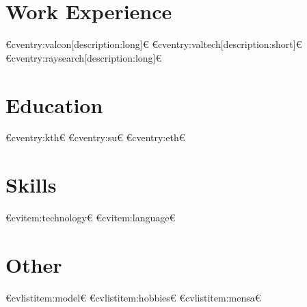 \documentclass[10pt,a4paper,sans]{moderncv}
\begin{document}
\makecvtitle



\section{Work Experience}
€cventry:valcon[description:long]€
€cventry:valtech[description:short]€
€cventry:raysearch[description:long]€

\section{Education}
€cventry:kth€
€cventry:su€
€cventry:eth€

\section{Skills}
€cvitem:technology€
€cvitem:language€

\section{Other}
€cvlistitem:model€
€cvlistitem:hobbies€
€cvlistitem:mensa€


%

\vspace{10 mm}

\end{document}
